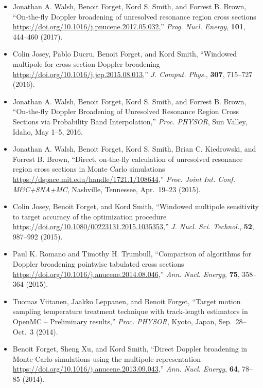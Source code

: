 \begin{itemize}

\item Jonathan A. Walsh, Benoit Forget, Kord S. Smith, and Forrest B. Brown,
``On-the-fly Doppler broadening of unresolved resonance region cross sections
\url{https://doi.org/10.1016/j.pnucene.2017.05.032},'' \textit{Prog. Nucl. Energy},
\textbf{101}, 444--460 (2017).

\item Colin Josey, Pablo Ducru, Benoit Forget, and Kord Smith, ``Windowed multipole
for cross section Doppler broadening
\url{https://doi.org/10.1016/j.jcp.2015.08.013},'' \textit{J. Comput. Phys.}, \textbf{307},
715--727 (2016).

\item Jonathan A. Walsh, Benoit Forget, Kord S. Smith, and Forrest B. Brown,
``On-the-fly Doppler Broadening of Unresolved Resonance Region Cross Sections
via Probability Band Interpolation,'' \textit{Proc. PHYSOR}, Sun Valley, Idaho, May
1--5, 2016.

\item Jonathan A. Walsh, Benoit Forget, Kord S. Smith, Brian C. Kiedrowski, and
Forrest B. Brown, ``Direct, on-the-fly calculation of unresolved resonance
region cross sections in Monte Carlo simulations
\url{https://dspace.mit.edu/handle/1721.1/108644},'' \textit{Proc. Joint Int. Conf.
M\&C+SNA+MC},
Nashville, Tennessee, Apr.\ 19--23 (2015).

\item Colin Josey, Benoit Forget, and Kord Smith, ``Windowed multipole sensitivity
to target accuracy of the optimization procedure
\url{https://doi.org/10.1080/00223131.2015.1035353},''
\textit{J. Nucl. Sci. Technol.}, \textbf{52}, 987--992 (2015).

\item Paul K. Romano and Timothy H. Trumbull, ``Comparison of algorithms for Doppler
broadening pointwise tabulated cross sections
\url{https://doi.org/10.1016/j.anucene.2014.08.046},'' \textit{Ann. Nucl. Energy},
\textbf{75}, 358--364 (2015).

\item Tuomas Viitanen, Jaakko Leppanen, and Benoit Forget, ``Target motion sampling
temperature treatment technique with track-length estimators in OpenMC --
Preliminary results,'' \textit{Proc. PHYSOR}, Kyoto, Japan, Sep.\ 28--Oct.\ 3 (2014).

\item Benoit Forget, Sheng Xu, and Kord Smith, ``Direct Doppler broadening in Monte
Carlo simulations using the multipole representation
\url{https://doi.org/10.1016/j.anucene.2013.09.043},'' \textit{Ann. Nucl. Energy},
\textbf{64}, 78--85 (2014).

\end{itemize}

